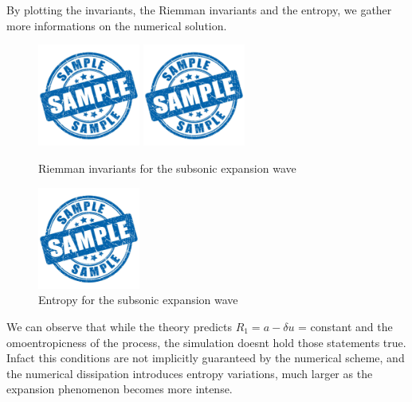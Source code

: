 \documentclass{report}
\begin{document}
By plotting the invariants, the Riemman invariants and the entropy, we gather more informations on the numerical solution.
\begin{figure}[H]
    \centering
    \includegraphics[width=0.3\textwidth]{Images/sample.jpg}
    \includegraphics[width=0.3\textwidth]{Images/sample.jpg}
    \caption{Riemman invariants  for the subsonic expansion wave}
    \label{fig:subsonic_expansion_wave_invariants}
\end{figure}
\begin{figure}[H]
    \centering
    \includegraphics[width=0.3\textwidth]{Images/sample.jpg}
    \caption{Entropy for the subsonic expansion wave}
    \label{fig:subsonic_expansion_wave_entropy}
\end{figure}
We can observe that while the theory predicts $R_1 = a-\delta u$ = constant and the omoentropicness of the process, the simulation doesnt hold those statements true.
Infact this conditions are not implicitly guaranteed by the numerical scheme, and the numerical dissipation introduces entropy variations, much larger as the expansion phenomenon becomes more intense.
\end{document}
